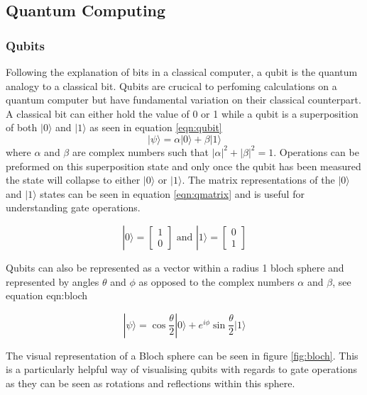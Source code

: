 \subsection{Quantum Computing}
\subsubsection{Qubits}
Following the explanation of bits in a classical computer, a qubit is the quantum analogy to a classical bit. Qubits are crucical to perfoming calculations on a quantum computer but have fundamental variation on their classical counterpart.
A classical bit can either hold the value of 0 or 1 while a qubit is a superposition of both $|0\rangle$ and $|1\rangle$ as seen in equation \ref{eqn:qubit}
\begin{equation}\label{eqn:qubit}
    |\psi\rangle = \alpha|0\rangle + \beta|1\rangle
\end{equation}
where $\alpha$ and $\beta$ are complex numbers such that $|\alpha|^2 + |\beta|^2 = 1$.
Operations can be preformed on this superposition state and only once the qubit has been measured the state will collapse to either $|0\rangle$ or $|1\rangle$. \cite{nielsen_quantum_2010}
The matrix representations of the $|0\rangle$ and $|1\rangle$ states can be seen in equation \ref{eqn:qmatrix} and is useful for understanding gate operations.

\begin{equation}\label{eqn:qmatrix}
    |0\rangle = \begin{bmatrix}
1 \\
0 
\end{bmatrix} \text{ and } |1\rangle = \begin{bmatrix}
0 \\
1 
\end{bmatrix}  
\end{equation}

Qubits can also be represented as a vector within a radius 1 bloch sphere and represented by angles $\theta$ and $\phi$ as opposed to the complex numbers $\alpha$ and $\beta$, see equation {eqn:bloch}

\begin{equation}\label{eqn:bloch}
    |\psi \rangle = \cos \frac{\theta}{2}|0\rangle + e^{i \phi}\sin \frac{\theta}{2} |1\rangle
\end{equation}

The visual representation of a Bloch sphere can be seen in figure \ref{fig:bloch}.
This is a particularly helpful way of visualising qubits with regards to gate operations as they can be seen as rotations and reflections within this sphere. \cite{noauthor_representing_nodate}


